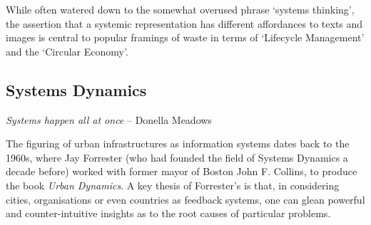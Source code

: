 \documentclass[nofonts,nols,justified,nobib]{tufte-book}
\begin{document}
While often watered down to the somewhat overused phrase `systems thinking', the assertion that a systemic representation has different affordances to texts and images is central to popular framings of waste in terms of `Lifecycle Management' and the `Circular Economy'.

\subsection*{Systems Dynamics}

\begin{flushright}
\emph{Systems happen all at once} \cite{meadows_thinking_2008}
-- Donella Meadows
\end{flushright}
The figuring of urban infrastructures as information systems dates back to the 1960s, where Jay Forrester (who had founded the field of Systems Dynamics a decade before) worked with former mayor of Boston John F. Collins, to produce the book \emph{Urban Dynamics}. A key thesis of Forrester's is that, in considering cities, organisations or even countries as feedback systems, one can glean powerful and counter-intuitive insights as to the root causes of particular problems. %
\end{document}
